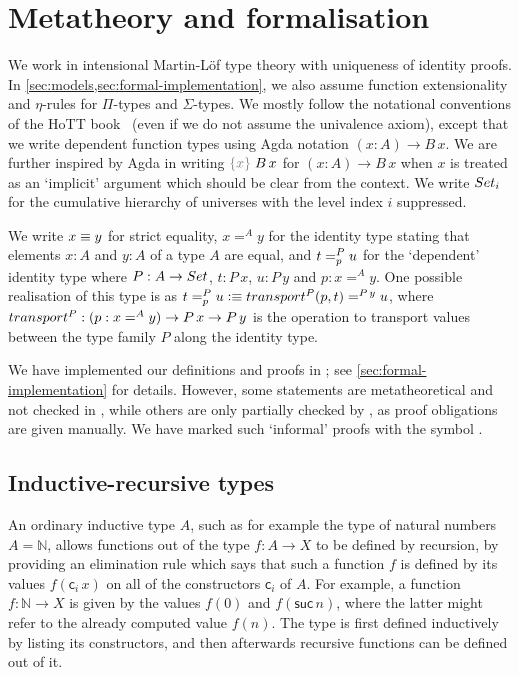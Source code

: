 \documentclass[a4paper,UKenglish,numberwithinsect,cleveref,thm-restate]{lipics-v2021}
\begin{document}
\section{Metatheory and formalisation} \label{sec:meta}

We work in intensional Martin-L\"of type theory with uniqueness of identity proofs. In \cref{sec:models,sec:formal-implementation}, we also assume function extensionality and $\eta$-rules for $\Pi$-types and $\Sigma$-types.
%
We mostly follow the notational conventions of the HoTT book~\cite{UFP2013} (even if we do not assume the univalence axiom), except that we write dependent function types using Agda notation $(x : A) \to B\,x$.
%
We are further inspired by Agda in writing $\implicit{x}\;B\,x$ for $(x : A) \to B\,x$ when $x$ is treated as an `implicit' argument which should be clear from the context.
We write $\Set_i$ for the cumulative hierarchy of universes with the level index $i$ suppressed.

We write $x \jdeq y$ for strict equality, $x =^{A} y$ for the identity type stating that elements $x : A$ and $y : A$ of a type $A$ are equal, and $\dpath{P}{p}{t}{u}$ for the `dependent' identity type where $P : A \to \Set$, $t : P\,x$, $u : P\,y$ and $p : x =^A y$. One possible realisation of this type is as $t =^{P}_{p} u \defeq \transfib{P}{p}{t} =^{P\,y} u$, where $\transfibf{P} : (p : x =^A y) \to P\,x \to P\,y$ is the operation to transport values between the type family $P$ along the identity type.
%

We have implemented our definitions and proofs in \Agda; see \cref{sec:formal-implementation} for details.
However, some statements are metatheoretical and not checked in \Agda, while others are only partially checked by \Agda, as proof obligations are given manually. %
We have marked such `informal' proofs with the symbol \resizebox*{!}{\baselineskip}{\textdbend}.

\subsection{Inductive-recursive types}

An ordinary inductive type $A$, such as for example the type of natural numbers $A = \mathbb{N}$, allows functions out of the type $f : A \to X$ to be defined by recursion, by providing an elimination rule which says that such a function $f$ is defined by its values $f(\mathsf{c}_i\,x)$ on all of the constructors $\mathsf{c}_i$ of $A$. For example, a function $f: \mathbb{N} \to X$ is given by the values $f(0)$ and $f(\mathsf{suc}\,n)$, where the latter might refer to the already computed value $f(n)$.
%
The type is first defined inductively by listing its constructors, and then afterwards recursive functions can be defined out of it.
\end{document}
